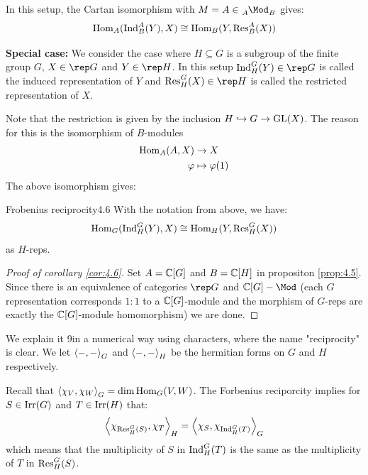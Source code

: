 \documentclass[twoside = false,	%
		headsepline,		%
		parskip = true,
		]{scrbook}						%
\begin{document}
        In this setup, the Cartan isomorphism with $M = A \in \tensor[_A]{\Mod}{_B}$ gives:
        \begin{equation*}
            \mathrm{Hom}_A(\mathrm{Ind}_B^A(Y),X) \cong \mathrm{Hom}_B(Y,\mathrm{Res}_B^A(X))
        \end{equation*}

    \textbf{Special case:}
        We consider the case where $H \subseteq G$ is a subgroup of the finite group $G$, $X \in \rep G$ and $Y \in \rep H$. In this setup $\Ind_H^G(Y) \in \rep G$ is called the induced representation of $Y$ and $\Res_H^G(X) \in \rep H$ is called the restricted representation of $X$.

        Note that the restriction is given by the inclusion $H \hookrightarrow G \to \mathrm{GL}(X)$. The reason for this is the isomorphism of $B$-modules
        \begin{equation*}
        \begin{split}
            \mathrm{Hom}_A(A,X) &\to X \\
            \varphi &\mapsto \varphi(1)
        \end{split}
        \end{equation*}
        The above isomorphism gives:
        \begin{corollary}{Frobenius reciprocity}{4.6}
            With the notation from above, we have:
            \begin{equation*}
                \mathrm{Hom}_G(\mathrm{Ind}_H^G(Y),X) \cong \mathrm{Hom}_H(Y,\mathrm{Res}_H^G(X))
            \end{equation*}
            as $H$-reps.
        \end{corollary}

        \begin{proof}[Proof of corollary \ref{cor:4.6}]
            Set $A = \mathbb C[G]$ and $B = \mathbb C[H]$ in propositon \ref{prop:4.5}. Since there is an equivalence of categories $\rep G$ and $ \C[G]-\Mod$ (each $G$ representation corresponds $1:1$ to a $\mathbb C[G]$-module and the morphism of $G$-reps are exactly the $\mathbb C[G]$-module homomorphism) we are done.
        \end{proof}

        We explain it 9in a numerical way using characters, where the name "reciprocity" is clear. We let $\left\langle -,-\right\rangle_G$ and $\left\langle -,-\right\rangle_H$ be the hermitian forms on $G$ and $H$ respectively.
        
        Recall that $\left\langle \chi_V,\chi_W\right\rangle_G = \dim \mathrm{Hom}_G(V,W)$. The Forbenius reciporcity implies for $S \in \mathrm{Irr}(G)$ and $T \in \mathrm{Irr}(H)$ that:
        \begin{equation*}
            \left\langle \chi_{\mathrm{Res}_H^G(S)},\chi_T\right\rangle_H = \left\langle \chi_S,\chi_{\mathrm{Ind}_H^G(T)}\right\rangle_G
        \end{equation*}
        which means that the multiplicity of $S$ in $\mathrm{Ind}_H^G(T)$ is the same as the multiplicity of $T$ in $\mathrm{Res}_H^G(S)$.
\end{document}
